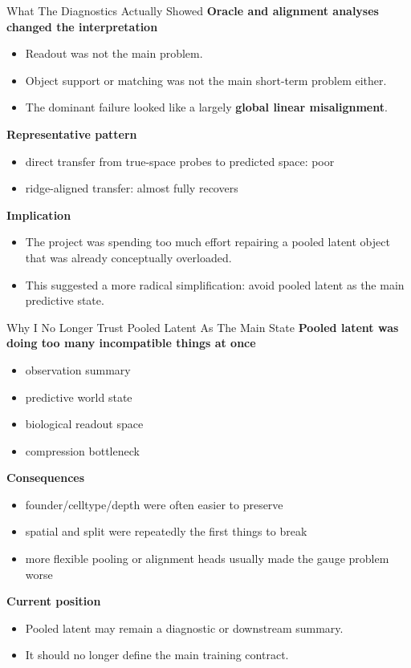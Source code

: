 \documentclass[aspectratio=169,11pt]{beamer}
\begin{document}
\begin{frame}{What The Diagnostics Actually Showed}
\textbf{Oracle and alignment analyses changed the interpretation}
\begin{itemize}
    \item Readout was not the main problem.
    \item Object support or matching was not the main short-term problem either.
    \item The dominant failure looked like a largely \textbf{global linear misalignment}.
\end{itemize}

\vspace{0.5em}
\textbf{Representative pattern}
\begin{itemize}
    \item direct transfer from true-space probes to predicted space: poor
    \item ridge-aligned transfer: almost fully recovers
\end{itemize}

\vspace{0.5em}
\textbf{Implication}
\begin{itemize}
    \item The project was spending too much effort repairing a pooled latent object that was already conceptually overloaded.
    \item This suggested a more radical simplification:
    avoid pooled latent as the main predictive state.
\end{itemize}
\end{frame}

\begin{frame}{Why I No Longer Trust Pooled Latent As The Main State}
\textbf{Pooled latent was doing too many incompatible things at once}
\begin{itemize}
    \item observation summary
    \item predictive world state
    \item biological readout space
    \item compression bottleneck
\end{itemize}

\vspace{0.5em}
\textbf{Consequences}
\begin{itemize}
    \item founder/celltype/depth were often easier to preserve
    \item spatial and split were repeatedly the first things to break
    \item more flexible pooling or alignment heads usually made the gauge problem worse
\end{itemize}

\vspace{0.5em}
\textbf{Current position}
\begin{itemize}
    \item Pooled latent may remain a diagnostic or downstream summary.
    \item It should no longer define the main training contract.
\end{itemize}
\end{frame}
\end{document}
